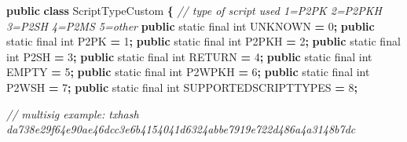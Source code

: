 \documentclass[
  italian,
  openany]{book}
\newenvironment{Shaded}{\begin{snugshade}}{\end{snugshade}}
\newcommand{\BuiltInTok}[1]{#1}
\newcommand{\CommentTok}[1]{\textcolor[rgb]{0.56,0.35,0.01}{\textit{#1}}}
\newcommand{\DataTypeTok}[1]{\textcolor[rgb]{0.13,0.29,0.53}{#1}}
\newcommand{\DecValTok}[1]{\textcolor[rgb]{0.00,0.00,0.81}{#1}}
\newcommand{\KeywordTok}[1]{\textcolor[rgb]{0.13,0.29,0.53}{\textbf{#1}}}
\newcommand{\NormalTok}[1]{#1}
\newcommand{\OperatorTok}[1]{\textcolor[rgb]{0.81,0.36,0.00}{\textbf{#1}}}
\begin{document}
\begin{Shaded}
\begin{Highlighting}[]
\KeywordTok{public} \KeywordTok{class}\NormalTok{ ScriptTypeCustom }\OperatorTok{\{}
    \CommentTok{// type of script used 1=P2PK 2=P2PKH 3=P2SH 4=P2MS 5=other}
    \KeywordTok{public} \DataTypeTok{static} \DataTypeTok{final} \DataTypeTok{int} \BuiltInTok{UNKNOWN} \OperatorTok{=} \DecValTok{0}\OperatorTok{;}
    \KeywordTok{public} \DataTypeTok{static} \DataTypeTok{final} \DataTypeTok{int}\NormalTok{ P2PK    }\OperatorTok{=} \DecValTok{1}\OperatorTok{;}
    \KeywordTok{public} \DataTypeTok{static} \DataTypeTok{final} \DataTypeTok{int}\NormalTok{ P2PKH   }\OperatorTok{=} \DecValTok{2}\OperatorTok{;}
    \KeywordTok{public} \DataTypeTok{static} \DataTypeTok{final} \DataTypeTok{int}\NormalTok{ P2SH    }\OperatorTok{=} \DecValTok{3}\OperatorTok{;}
    \KeywordTok{public} \DataTypeTok{static} \DataTypeTok{final} \DataTypeTok{int}\NormalTok{ RETURN  }\OperatorTok{=} \DecValTok{4}\OperatorTok{;}
    \KeywordTok{public} \DataTypeTok{static} \DataTypeTok{final} \DataTypeTok{int}\NormalTok{ EMPTY   }\OperatorTok{=} \DecValTok{5}\OperatorTok{;}
    \KeywordTok{public} \DataTypeTok{static} \DataTypeTok{final} \DataTypeTok{int}\NormalTok{ P2WPKH  }\OperatorTok{=} \DecValTok{6}\OperatorTok{;}
    \KeywordTok{public} \DataTypeTok{static} \DataTypeTok{final} \DataTypeTok{int}\NormalTok{ P2WSH   }\OperatorTok{=} \DecValTok{7}\OperatorTok{;}
    \KeywordTok{public} \DataTypeTok{static} \DataTypeTok{final} \DataTypeTok{int}\NormalTok{ SUPPORTEDSCRIPTTYPES }\OperatorTok{=} \DecValTok{8}\OperatorTok{;}

    \CommentTok{// multisig example: txhash da738e29f64e90ae46dcc3e6b4154041d6324abbe7919e722d486a4a3148b7dc}


\end{Highlighting}
\end{Shaded}
\end{document}

